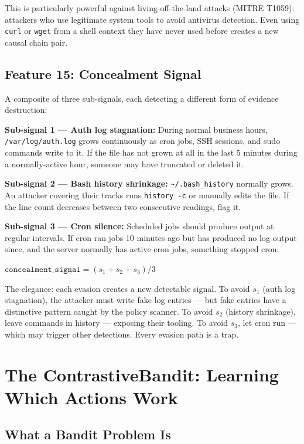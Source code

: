 \documentclass[11pt,a4paper]{article}
\begin{document}
This is particularly powerful against living-off-the-land attacks (MITRE T1059): attackers who use legitimate system tools to avoid antivirus detection. Even using \texttt{curl} or \texttt{wget} from a shell context they have never used before creates a new causal chain pair.

\subsection{Feature 15: Concealment Signal}

A composite of three sub-signals, each detecting a different form of evidence destruction:

\textbf{Sub-signal 1 — Auth log stagnation:} During normal business hours, \texttt{/var/log/auth.log} grows continuously as cron jobs, SSH sessions, and sudo commands write to it. If the file has not grown at all in the last 5 minutes during a normally-active hour, someone may have truncated or deleted it.

\textbf{Sub-signal 2 — Bash history shrinkage:} \texttt{\~{}/.bash\_history} normally grows. An attacker covering their tracks runs \texttt{history -c} or manually edits the file. If the line count decreases between two consecutive readings, flag it.

\textbf{Sub-signal 3 — Cron silence:} Scheduled jobs should produce output at regular intervals. If cron ran jobs 10 minutes ago but has produced no log output since, and the server normally has active cron jobs, something stopped cron.

$\texttt{concealment\_signal} = (s_1 + s_2 + s_3) / 3$

The elegance: each evasion creates a new detectable signal. To avoid $s_1$ (auth log stagnation), the attacker must write fake log entries — but fake entries have a distinctive pattern caught by the policy scanner. To avoid $s_2$ (history shrinkage), leave commands in history — exposing their tooling. To avoid $s_3$, let cron run — which may trigger other detections. Every evasion path is a trap.

\section{The ContrastiveBandit: Learning Which Actions Work}

\subsection{What a Bandit Problem Is}
\end{document}
